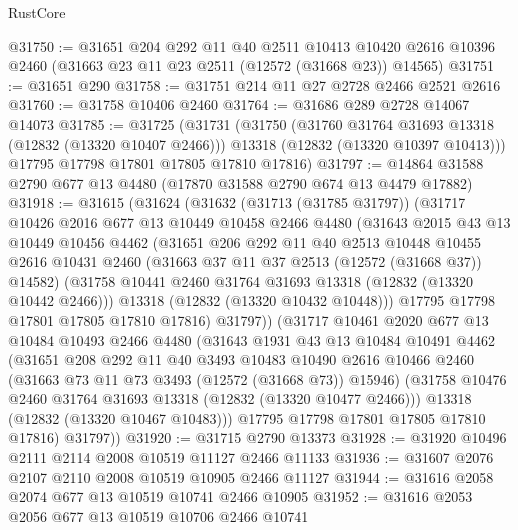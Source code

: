 \begin{lexlean}{RustCore}
\begin{coremodule}
@31750 := @31651
    @204
    @292
    @11
    @40
    @2511
    @10413
    @10420
    @2616
    @10396
    @2460
    (@31663 @23 @11 @23 @2511 (@12572 (@31668 @23)) @14565)
@31751 := @31651 @290
@31758 := @31751 @214 @11 @27 @2728 @2466 @2521 @2616
@31760 := @31758 @10406 @2460
@31764 := @31686 @289 @2728 @14067 @14073
@31785 := @31725
    (@31731
      (@31750
        (@31760 @31764 @31693 @13318 (@12832 (@13320 @10407 @2466)))
        @13318
        (@12832 (@13320 @10397 @10413)))
      @17795
      @17798
      @17801
      @17805
      @17810
      @17816)
@31797 := @14864 @31588 @2790 @677 @13 @4480 (@17870 @31588 @2790 @674 @13 @4479 @17882)
@31918 := @31615
    (@31624
      (@31632
        (@31713 (@31785 @31797))
        (@31717
          @10426
          @2016
          @677
          @13
          @10449
          @10458
          @2466
          @4480
          (@31643
            @2015
            @43
            @13
            @10449
            @10456
            @4462
            (@31651
              @206
              @292
              @11
              @40
              @2513
              @10448
              @10455
              @2616
              @10431
              @2460
              (@31663 @37 @11 @37 @2513 (@12572 (@31668 @37)) @14582)
              (@31758 @10441 @2460 @31764 @31693 @13318 (@12832 (@13320 @10442 @2466)))
              @13318
              (@12832 (@13320 @10432 @10448)))
            @17795
            @17798
            @17801
            @17805
            @17810
            @17816)
          @31797))
      (@31717
        @10461
        @2020
        @677
        @13
        @10484
        @10493
        @2466
        @4480
        (@31643
          @1931
          @43
          @13
          @10484
          @10491
          @4462
          (@31651
            @208
            @292
            @11
            @40
            @3493
            @10483
            @10490
            @2616
            @10466
            @2460
            (@31663 @73 @11 @73 @3493 (@12572 (@31668 @73)) @15946)
            (@31758 @10476 @2460 @31764 @31693 @13318 (@12832 (@13320 @10477 @2466)))
            @13318
            (@12832 (@13320 @10467 @10483)))
          @17795
          @17798
          @17801
          @17805
          @17810
          @17816)
        @31797))
@31920 := @31715 @2790 @13373
@31928 := @31920 @10496 @2111 @2114 @2008 @10519 @11127 @2466 @11133
@31936 := @31607 @2076 @2107 @2110 @2008 @10519 @10905 @2466 @11127
@31944 := @31616 @2058 @2074 @677 @13 @10519 @10741 @2466 @10905
@31952 := @31616 @2053 @2056 @677 @13 @10519 @10706 @2466 @10741

\end{coremodule}
\end{lexlean}

